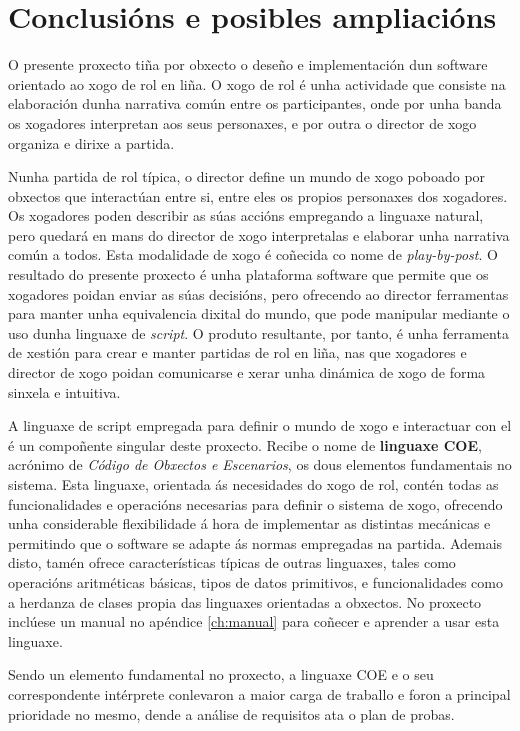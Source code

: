 \chapter{Conclusións e posibles ampliacións}
O presente proxecto tiña por obxecto o deseño e implementación dun software
orientado ao xogo de rol en liña. O xogo de rol é unha actividade que consiste
na elaboración dunha narrativa común entre os participantes, onde por unha banda
os xogadores interpretan aos seus personaxes, e por outra o director de xogo
organiza e dirixe a partida.

Nunha partida de rol típica, o director define un mundo de xogo poboado por
obxectos que interactúan entre si, entre eles os propios personaxes  dos
xogadores. Os xogadores poden describir as súas accións empregando a linguaxe
natural, pero quedará en mans do director de xogo interpretalas e elaborar unha
narrativa común a todos. Esta modalidade de xogo é coñecida co nome de
\textit{play-by-post}. O resultado do presente proxecto é unha plataforma
software que permite que os xogadores poidan enviar as súas decisións, pero
ofrecendo ao director ferramentas para manter unha equivalencia dixital do mundo, que pode manipular mediante o uso dunha linguaxe
de \textit{script}. O produto resultante, por tanto, é unha
ferramenta de xestión para crear e manter partidas de rol en liña, nas que
xogadores e director de xogo poidan comunicarse e xerar unha dinámica de xogo de
forma sinxela e intuitiva.

A linguaxe de script empregada para definir o mundo de xogo e interactuar con el
é un compoñente singular deste proxecto. Recibe o nome de \textbf{linguaxe COE},
acrónimo de \textit{Código de Obxectos e Escenarios}, os dous elementos
fundamentais no sistema. Esta linguaxe, orientada ás necesidades do xogo de rol, contén todas as funcionalidades e operacións
necesarias para definir o sistema de xogo, ofrecendo unha considerable
flexibilidade á hora de implementar as distintas mecánicas e permitindo que o
software se adapte ás normas empregadas na partida.
Ademais disto, tamén ofrece características típicas de outras linguaxes, tales
como operacións aritméticas básicas, tipos de datos primitivos, e
funcionalidades como a herdanza de clases propia das linguaxes orientadas a
obxectos. No proxecto inclúese un manual no apéndice \ref{ch:manual} para
coñecer e aprender a usar esta linguaxe.

Sendo un elemento fundamental no proxecto, a linguaxe COE e o seu correspondente
intérprete conlevaron a maior carga de traballo e foron a
principal prioridade no mesmo, dende a análise de requisitos ata o plan de
probas.

